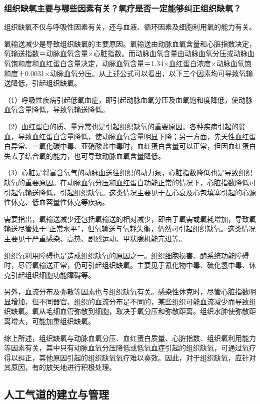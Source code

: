 \subsubsection{组织缺氧主要与哪些因素有关？氧疗是否一定能够纠正组织缺氧？}

组织缺氧不仅与呼吸性因素有关，还与血液、循环因素及细胞利用氧的能力有关。

氧输送减少是导致组织缺氧的主要原因。氧输送由动脉血氧含量和心脏指数决定，氧输送指数＝动脉血氧含量×心脏指数。而动脉血氧含量由动脉血氧分压或动脉血氧饱和度和血红蛋白含量决定，动脉血氧含量＝1.34×血红蛋白浓度×动脉血氧饱和度＋0.0031×动脉血氧分压。从上述公式可以看出，以下三个因素均可导致氧输送降低，引起组织缺氧。

（1）呼吸性疾病引起低氧血症，即引起动脉血氧分压及血氧饱和度降低，使动脉血氧含量降低，导致氧输送降低。

（2）血红蛋白的质、量异常也是引起组织缺氧的重要原因。各种疾病引起的贫血，导致血红蛋白含量降低，使动脉血氧含量明显下降；另一方面，先天性血红蛋白异常、一氧化碳中毒、亚硝酸盐中毒时，血红蛋白含量可以正常，但因血红蛋白失去了结合氧的能力，也可导致动脉血氧含量降低。

（3）心脏是将富含氧气的动脉血送往组织的动力泵，心脏指数降低也是导致组织缺氧的重要原因。在动脉血氧分压和血红蛋白功能正常的情况下，心脏指数降低可引起氧输送降低，引起组织缺氧。这类情况主要见于左心衰及心包填塞引起的心源性休克、低血容量性休克等疾病。

需要指出，氧输送减少还包括氧输送的相对减少，即由于氧需或氧耗增加，导致氧输送尽管处于“正常水平”，但氧输送与氧耗失衡，仍然可引起组织缺氧。这类情况主要见于严重感染、高热、剧烈运动、甲状腺机能亢进等。

组织氧利用障碍也是造成组织缺氧的原因之一。组织细胞损害、酶系统功能障碍时，尽管氧输送正常，仍可引起组织缺氧。主要见于氰化物中毒、硫化氢中毒、休克引起组织细胞功能障碍等。

另外，血流分布及弥散等因素也与组织缺氧有关。感染性休克时，尽管心脏指数明显增加，但不同器官、组织的血流分布是不同的，某些组织可能血流减少而导致组织缺氧。氧从毛细血管弥散到细胞，取决于氧分压和弥散距离。组织水肿使弥散距离增大，可能加重组织缺氧。

综上所述，组织缺氧与动脉血氧分压、血红蛋白质量、心脏指数、组织氧利用能力等因素有关，其中只有动脉血氧分压降低或低氧血症引起的组织缺氧，可通过氧疗得以纠正，其他原因引起的组织缺氧氧疗难以奏效。因此，对于组织缺氧，应针对其原因，有的放矢地进行积极处理。

\subsection{人工气道的建立与管理}

